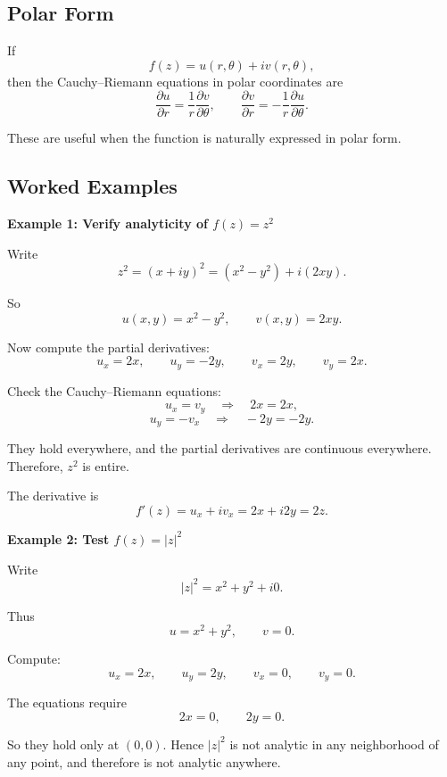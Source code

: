 \subsection*{Polar Form}

If
\[
    f(z)=u(r,\theta)+iv(r,\theta),
\]
then the Cauchy--Riemann equations in polar coordinates are
\[
    \frac{\partial u}{\partial r}
    =
    \frac{1}{r}\frac{\partial v}{\partial \theta},
    \qquad
    \frac{\partial v}{\partial r}
    =
    -\frac{1}{r}\frac{\partial u}{\partial \theta}.
\]

These are useful when the function is naturally expressed in polar form.

\subsection*{Worked Examples}

\begin{examplebox}
    \textbf{Example 1: Verify analyticity of $f(z)=z^2$}

    Write
    \[
        z^2=(x+iy)^2=(x^2-y^2)+i(2xy).
    \]

    So
    \[
        u(x,y)=x^2-y^2,
        \qquad
        v(x,y)=2xy.
    \]

    Now compute the partial derivatives:
    \[
        u_x=2x,
        \qquad
        u_y=-2y,
        \qquad
        v_x=2y,
        \qquad
        v_y=2x.
    \]

    Check the Cauchy--Riemann equations:
    \[
        u_x=v_y \quad \Rightarrow \quad 2x=2x,
    \]
    \[
        u_y=-v_x \quad \Rightarrow \quad -2y=-2y.
    \]

    They hold everywhere, and the partial derivatives are continuous everywhere. Therefore, $z^2$ is entire.

    The derivative is
    \[
        f'(z)=u_x+iv_x=2x+i2y=2z.
    \]
\end{examplebox}

\begin{examplebox}
    \textbf{Example 2: Test $f(z)=|z|^2$}

    Write
    \[
        |z|^2=x^2+y^2+i0.
    \]

    Thus
    \[
        u=x^2+y^2,
        \qquad
        v=0.
    \]

    Compute:
    \[
        u_x=2x,
        \qquad
        u_y=2y,
        \qquad
        v_x=0,
        \qquad
        v_y=0.
    \]

    The equations require
    \[
        2x=0,
        \qquad
        2y=0.
    \]

    So they hold only at $(0,0)$. Hence $|z|^2$ is not analytic in any neighborhood of any point, and therefore is not analytic anywhere.
\end{examplebox}

